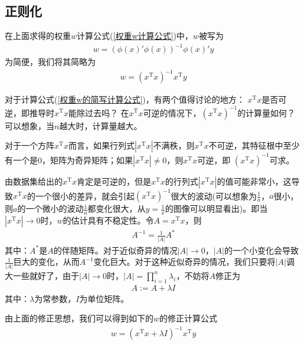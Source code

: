     \subsection{正则化}
        \par
        在上面求得的权重$w$计算公式(\ref{权重w计算公式})中，$w$被写为
        \begin{align*}
        w = (\phi(x)'\phi(x))^{-1}\phi(x)'y
        \end{align*}
        为简便，我们将其简略为
        \begin{align}
        \label{权重w的简写计算公式}
        w = (x^{\mathrm{T}}x)^{-1}x^{\mathrm{T}}y
        \end{align}
        \par
        对于计算公式(\ref{权重w的简写计算公式})，有两个值得讨论的地方：
         $x^{\mathrm{T}}x$是否可逆，即推导时$x^{\mathrm{T}}x$能除过去吗？
         在$x^{\mathrm{T}}x$可逆的情况下，$(x^{\mathrm{T}}x)^{-1}$的计算量如何？可以想象，当$n$越大时，计算量越大。
        \par
        对于一个方阵$x^{\mathrm{T}}x$而言，如果行列式$|x^{\mathrm{T}}x|$不满秩，则$x^{\mathrm{T}}x$不可逆，其特征根中至少有一个是0，矩阵为奇异矩阵；如果$|x^{\mathrm{T}}x| \neq 0$，则$x^{\mathrm{T}}x$可逆，即 $(x^{\mathrm{T}}x)^{-1}$可求。
        \par
        由数据集给出的$x^{\mathrm{T}}x$肯定是可逆的，但是$x^{\mathrm{T}}x$的行列式$|x^{\mathrm{T}}x|$的值可能非常小，这导致$x^{\mathrm{T}}x$的一个很小的差异，就会引起$(x^{\mathrm{T}}x)^{-1}$很大的波动(可以想象为$\frac{1}{a}$，$a$很小，则$a$的一个微小的波动$\frac{1}{a}$都变化很大，从$y = \frac{1}{x}$的图像可以明显看出)。即当$|x^{\mathrm{T}}x| \rightarrow 0$时，$w$的估计具有不稳定性。令$A = x^{\mathrm{T}}x$，则
        \begin{align*}
        A^{-1}= \frac{1}{|A|} A^*
        \end{align*}
        其中：$A^*$是$A$的伴随矩阵。对于近似奇异的情况$|A|\rightarrow 0$，$|A|$的一个小变化会导致$\frac{1}{|A|}$巨大的变化，从而$A^{-1}$变化巨大。对于这种近似奇异的情况，我们只要将$|A|$调大一些就好了，由于$|A|\rightarrow 0$时，$|A| = \prod_{i=1}^n\lambda_i$，不妨将$A$修正为
        \begin{align*}
        A := A+\lambda I
        \end{align*}
        其中：$\lambda$为常参数，$I$为单位矩阵。
        \par
        由上面的修正思想，我们可以得到如下的$w$的修正计算公式
        \begin{align}
        \label{权重w修正计算公式}
        w = (x^{\mathrm{T}}x + \lambda I)^{-1}x^{\mathrm{T}}y
        \end{align}
